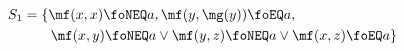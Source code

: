 
\begin{align*}
S_1 &= \{ 
	\mf(x,x)\foNEQ a,
	\mf(y,\mg(y)) \foEQ a,\\
	&\qquad\mf(x,y)\foNEQ a \lor \mf (y,z)\foNEQ a \lor \mf(x,z)\foEQ a 
	\}
	\\
\end{align*}